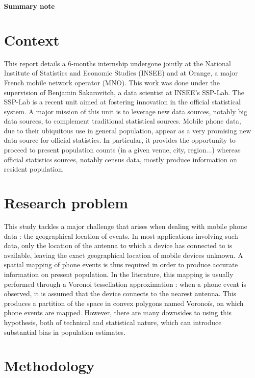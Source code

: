 \documentclass[12pt]{article}
\begin{document}
\begin{center}
\LARGE \textbf{Summary note}
\end{center}

\section{Context}

This report details a 6-months internship undergone jointly at the National Institute of Statistics and Economic Studies (INSEE) and at Orange, a major French mobile network operator (MNO). This work was done under the supervision of Benjamin Sakarovitch, a data scientist at INSEE's SSP-Lab. The SSP-Lab is a recent unit aimed at fostering innovation in the official statistical system. A major mission of this unit is to leverage new data sources, notably big data sources, to complement traditional statistical sources. Mobile phone data, due to their ubiquitous use in general population, appear as a very promising new data source for official statistics. In particular, it provides the opportunity to proceed to present population counts (in a given venue, city, region...) whereas official statistics sources, notably census data, mostly produce information on resident population.

\section{Research problem}

This study tackles a major challenge that arises when dealing with mobile phone data : the geographical location of events. In most applications involving such data, only the location of the antenna to which a device has connected to is available, leaving the exact geographical location of mobile devices unknown. A spatial mapping of phone events is thus required in order to produce accurate information on present population. In the literature, this mapping is usually performed through a Voronoi tessellation approximation : when a phone event is observed, it is assumed that the device connects to the nearest antenna. This produces a partition of the space in convex polygons named Voronoïs, on which phone events are mapped. However, there are many downsides to using this hypothesis, both of technical and statistical nature, which can introduce substantial bias in population estimates.

\section{Methodology}
\end{document}
